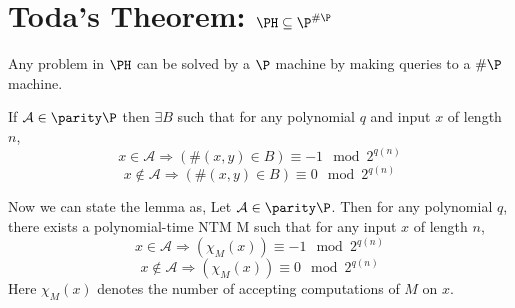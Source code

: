 \documentclass[11pt]{article}
\begin{document}
\section{Toda's Theorem: $\PH\subseteq\P^{\#\P}$} Any problem in $\PH$
can be solved by a $\P$ machine by making queries to a $\#\P$ machine.
\begin{lemma}
\label{lemma1} If $\mathcal{A}\in \parity\P$ then $\exists B$ such
that for any polynomial $q$ and input $x$ of length $n$,
$$x\in \mathcal{A}\Rightarrow (\#(x,y)\in B)\equiv -1 \mod 2^{q(n)}$$
$$x\notin \mathcal{A}\Rightarrow (\#(x,y)\in B)\equiv 0 \mod 2^{q(n)}$$

Now we can state the lemma as, Let $\mathcal{A}\in \parity\P$. Then
for any polynomial $q$, there exists a polynomial-time NTM M such that
for any input $x$ of length $n$,
$$x\in \mathcal{A}\Rightarrow (\chi_M(x))\equiv -1\mod 2^{q(n)}$$
$$x\notin \mathcal{A}\Rightarrow (\chi_M(x))\equiv 0 \mod 2^{q(n)}$$
Here $\chi_M(x)$ denotes the number of accepting computations of $M$
on $x$.
\end{lemma}
\end{document}
